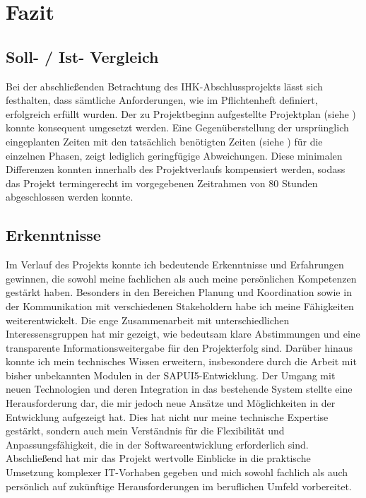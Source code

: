 \section{Fazit}
\label{sec:Fazit}

\subsection{Soll- / Ist- Vergleich}
\label{sec:Soll- / Ist- Vergleich}
Bei der abschließenden Betrachtung des IHK-Abschlussprojekts lässt sich festhalten, dass sämtliche Anforderungen, wie im Pflichtenheft definiert, erfolgreich erfüllt wurden. Der zu Projektbeginn aufgestellte Projektplan (siehe ) konnte konsequent umgesetzt werden. Eine Gegenüberstellung der ursprünglich eingeplanten Zeiten mit den tatsächlich benötigten Zeiten (siehe ) für die einzelnen Phasen, zeigt lediglich geringfügige Abweichungen. Diese minimalen Differenzen konnten innerhalb des Projektverlaufs kompensiert werden, sodass das Projekt termingerecht im vorgegebenen Zeitrahmen von 80 Stunden abgeschlossen werden konnte.


\subsection{Erkenntnisse}
\label{sec:Erkenntnisse}
Im Verlauf des Projekts konnte ich bedeutende Erkenntnisse und Erfahrungen gewinnen, die sowohl meine fachlichen als auch meine persönlichen Kompetenzen gestärkt haben. Besonders in den Bereichen Planung und Koordination sowie in der Kommunikation mit verschiedenen Stakeholdern habe ich meine Fähigkeiten weiterentwickelt. Die enge Zusammenarbeit mit unterschiedlichen Interessensgruppen hat mir gezeigt, wie bedeutsam klare Abstimmungen und eine transparente Informationsweitergabe für den Projekterfolg sind.
Darüber hinaus konnte ich mein technisches Wissen erweitern, insbesondere durch die Arbeit mit bisher unbekannten Modulen in der SAPUI5-Entwicklung. Der Umgang mit neuen Technologien und deren Integration in das bestehende System stellte eine Herausforderung dar, die mir jedoch neue Ansätze und Möglichkeiten in der Entwicklung aufgezeigt hat. Dies hat nicht nur meine technische Expertise gestärkt, sondern auch mein Verständnis für die Flexibilität und Anpassungsfähigkeit, die in der Softwareentwicklung erforderlich sind.
Abschließend hat mir das Projekt wertvolle Einblicke in die praktische Umsetzung komplexer IT-Vorhaben gegeben und mich sowohl fachlich als auch persönlich auf zukünftige Herausforderungen im beruflichen Umfeld vorbereitet.

